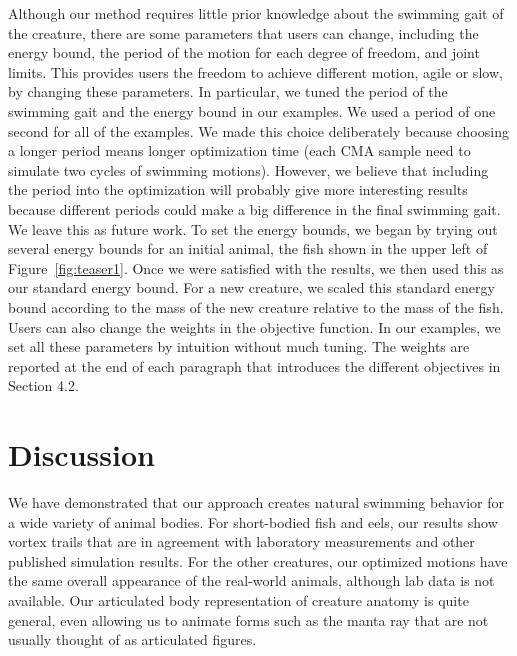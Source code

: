 Although our method requires little prior knowledge about the swimming gait of the creature,
there are some parameters that users can change, including the energy bound, the period of
the motion for each degree of freedom, and joint limits. This provides users the freedom to
achieve different motion, agile or slow, by changing these parameters. In particular, we tuned the period
of the swimming gait and the energy bound in our examples. We used a period of one second
for all of the examples. We made this choice deliberately because choosing a longer period means longer
optimization time (each CMA sample need to simulate two cycles of swimming motions). However, we believe
that including the period into the optimization will probably give more interesting results because different periods could make
a big difference in the final swimming gait. We leave this as future work. To set the energy bounds, we began by trying out several energy bounds
for an initial animal, the fish shown in the upper left of Figure~\ref{fig:teaser1}.
Once we were satisfied with the results, we then used this as our standard energy bound.
For a new creature, we scaled this standard energy bound according to the mass of the new creature
relative to the mass of the fish. Users can also change the weights in the objective function.
In our examples, we set all these parameters by intuition without much tuning. The weights
are reported at the end of each paragraph that introduces the different objectives in Section 4.2.

\section{Discussion}

We have demonstrated that our approach creates natural swimming behavior for
a wide variety of animal bodies.  For short-bodied fish and eels, our
results show vortex trails that are in agreement with laboratory
measurements and other published simulation results.  For the other
creatures, our optimized motions have the same overall appearance of the
real-world animals, although lab data is not available.  Our articulated
body representation of creature anatomy is quite general, even allowing us to
animate forms such as the manta ray that are not usually thought of as
articulated figures.


